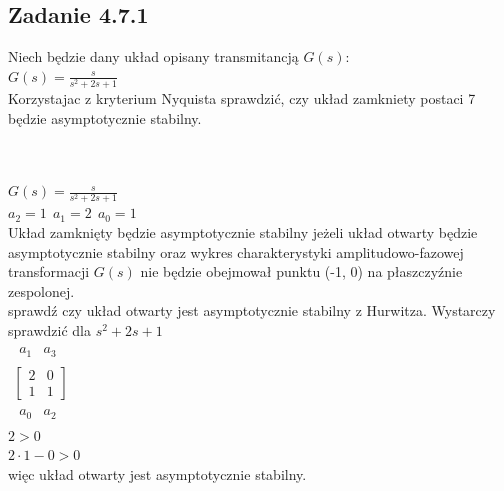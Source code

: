 \subsection*{Zadanie 4.7.1} {\color{darkgray}
	Niech będzie dany układ opisany transmitancją $G(s)$:\\
	$G(s)=\frac{s}{s^2+2s+1}$\\
	Korzystajac z kryterium Nyquista sprawdzić, czy układ zamkniety postaci 7 będzie asymptotycznie stabilny.
\begin{figure}[!h]
\end{figure}

}\lineh
\\\\
$G(s)=\frac{s}{s^2+2s+1}$\\
$a_2=1 \ \ a_1 =2 \ \ a_0 = 1$\\
Układ zamknięty będzie asymptotycznie stabilny jeżeli układ otwarty będzie asymptotycznie stabilny oraz wykres charakterystyki amplitudowo-fazowej transformacji $G(s)$ nie będzie obejmował punktu (-1, 0) na płaszczyźnie zespolonej.\\
sprawdź czy układ otwarty jest asymptotycznie stabilny z Hurwitza. Wystarczy sprawdzić dla $s^2+2s+1$\\
$
\begin{array}{c}
\begin{array}{cc}a_1 & a_3\end{array}\\
\left[\begin{array}{cc}2&0\\1&1\end{array}\right]\\
\begin{array}{cc}a_0&a_2\end{array}
\end{array}
$\\
$2>0$\\
$2\cdot 1-0>0$\\
więc układ otwarty jest asymptotycznie stabilny.
